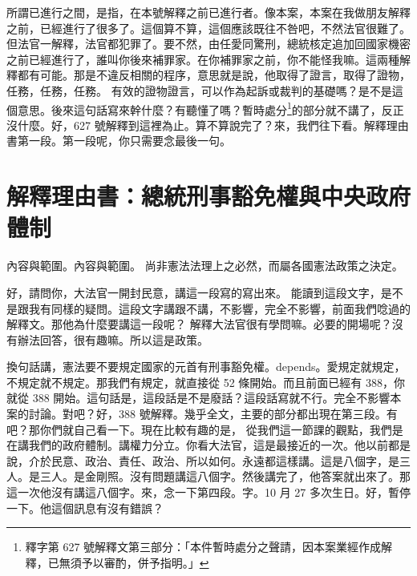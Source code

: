 \hypertarget{c11:cue:254}{}所謂已進行之間，是指，在本號解釋之前已進行者。像本案，本案在我做朋友解釋之前，已經進行了很多了。這個算不算，這個應該既往不咎吧，不然法官很難了。但法官一解釋，法官都犯罪了。要不然，由任愛同驚刑，總統核定追加回國家機密之前已經進行了，誰叫你後來補罪家。在你補罪家之前，你不能怪我嘛。這兩種解釋都有可能。那是不違反相關的程序，意思就是說，他取得了證言，取得了證物，任務，任務，任務。
\hypertarget{c11:cue:255}{}有效的證物證言，可以作為起訴或裁判的基礎嗎？是不是這個意思。後來這句話寫來幹什麼？有聽懂了嗎？暫時處分\footnote{釋字第 627 號解釋文第三部分：「本件暫時處分之聲請，因本案業經作成解釋，已無須予以審酌，併予指明。」}的部分就不講了，反正沒什麼。好，627 號解釋到這裡為止。算不算說完了？來，我們往下看。解釋理由書第一段。第一段呢，你只需要念最後一句。

\section{解釋理由書：總統刑事豁免權與中央政府體制}

\hypertarget{c11:cue:256}{}內容與範圍。內容與範圍。
\hypertarget{c11:cue:257}{}尚非憲法法理上之必然，而屬各國憲法政策之決定。\par{}好，請問你，大法官一開封民意，講這一段寫的寫出來。
\hypertarget{c11:cue:258}{}能讀到這段文字，是不是跟我有同樣的疑問。這段文字講跟不講，不影響，完全不影響，前面我們唸過的解釋文。那他為什麼要講這一段呢？
\hypertarget{c11:cue:259}{}解釋大法官很有學問嘛。必要的開場呢？沒有辦法回答，很有趣嘛。所以這是政策。

\hypertarget{c11:cue:260}{}換句話講，憲法要不要規定國家的元首有刑事豁免權。depends。愛規定就規定，不規定就不規定。那我們有規定，就直接從 52 條開始。而且前面已經有 388，你就從 388 開始。這句話是，這段話是不是廢話？這段話寫就不行。完全不影響本案的討論。對吧？好，388 號解釋。幾乎全文，主要的部分都出現在第三段。有吧？那你們就自己看一下。現在比較有趣的是，
\hypertarget{c11:cue:261}{}從我們這一節課的觀點，我們是在講我們的政府體制。講權力分立。你看大法官，這是最接近的一次。他以前都是說，介於民意、政治、責任、政治、所以如何。永遠都這樣講。這是八個字，是三人。是三人。是金剛照。沒有問題講這八個字。然後講完了，他答案就出來了。那這一次他沒有講這八個字。來，念一下第四段。字。10 月 27 多次生日。好，暫停一下。他這個訊息有沒有錯誤？

